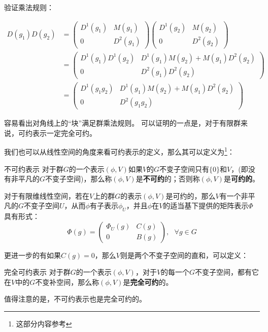 验证乘法规则：

\begin{align}
D(g_1)D(g_2)&=
\begin{pmatrix}
 D^1(g_1) & M(g_1)\\
 0 & D^2(g_1)
\end{pmatrix}
\begin{pmatrix}
 D^1(g_2) & M(g_2)\\
 0 & D^2(g_2)
\end{pmatrix} \\
&=\begin{pmatrix}
 D^1(g_1)D^1(g_2) & D^1(g_1)M(g_2)+M(g_1)D^2(g_2)\\
 0 & D^2(g_1)D^2(g_2)
\end{pmatrix} \\
&=\begin{pmatrix}
 D^1(g_1g_2) & D^1(g_1)M(g_2)+M(g_1)D^2(g_2)\\
 0 & D^2(g_1g_2)
\end{pmatrix}
\end{align}

容易看出对角线上的“块”满足群乘法规则。
可以证明的一点是，对于有限群来说，可约表示一定完全可约。







我们也可以从线性空间的角度来看可约表示的定义，那么其可以定义为\footnote{这部分内容参考\cite{维声表示}}：

\begin{definition}{不可约表示}
对于群$G$的一个表示$(\phi,V)$如果$V$的$G$不变子空间只有$\{0\}$和$V$，(即没有非平凡的$G$不变子空间)，那么称$(\phi,V)$是\textbf{不可约}的；否则称$(\phi,V)$是\textbf{可约的}。
\end{definition}

\begin{definition}{}
对于有限维线性空间，若在$V$上的群$G$的表示$(\phi,V)$是可约的，那么$V$有一个非平凡的$G$不变子空间$U$，从而$\phi$有子表示$\phi_U$，并且$\phi$在$V$的适当基下提供的矩阵表示$\Phi$具有形式：
$$\Phi(g)=\begin{pmatrix}
 \Phi_U(g) & C(g)\\
 0 & B(g)
\end{pmatrix},~~~\forall g\in G$$

\end{definition}

更进一步的有如果$C(g)=0$，那么$V$则是两个不变子空间的直和，可以定义：
\begin{definition}{完全可约表示}
对于群$G$的一个表示$(\phi,V)$，对于$V$的每一个$G$不变子空间，都有它在$V$中的$G$不变补空间，那么称$(\phi,V)$是\textbf{完全可约}的。
\end{definition}

值得注意的是，不可约表示也是完全可约的。












